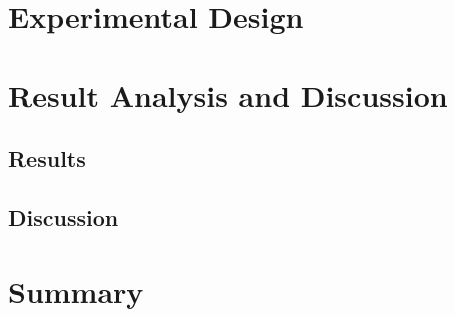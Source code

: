


\section{Experimental Design}






\section{Result Analysis and Discussion}


\subsection{Results}



\subsection{Discussion}




\section{Summary}


